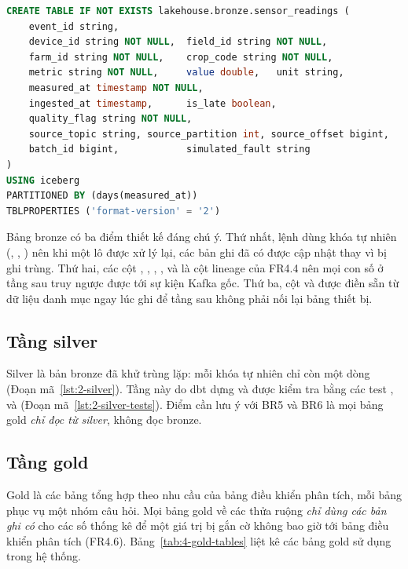 \begin{lstlisting}[language=SQL, caption={Bảng bronze}, label={lst:4-bronze-ddl}]
CREATE TABLE IF NOT EXISTS lakehouse.bronze.sensor_readings (
    event_id string,
    device_id string NOT NULL,  field_id string NOT NULL,
    farm_id string NOT NULL,    crop_code string NOT NULL,
    metric string NOT NULL,     value double,   unit string,
    measured_at timestamp NOT NULL,
    ingested_at timestamp,      is_late boolean,
    quality_flag string NOT NULL,
    source_topic string, source_partition int, source_offset bigint,
    batch_id bigint,            simulated_fault string
)
USING iceberg
PARTITIONED BY (days(measured_at))
TBLPROPERTIES ('format-version' = '2')
\end{lstlisting}

Bảng bronze có ba điểm thiết kế đáng chú ý. Thứ nhất, lệnh  dùng khóa tự nhiên (, , ) nên khi một lô được xử lý lại, các bản ghi đã có được cập nhật thay vì bị ghi trùng. Thứ hai, các cột , , , ,  và  là cột lineage của FR4.4 nên mọi con số ở tầng sau truy ngược được tới sự kiện Kafka gốc. Thứ ba, cột  và  được điền sẵn từ dữ liệu danh mục ngay lúc ghi để tầng sau không phải nối lại bảng thiết bị.

\subsection{Tầng silver}
\label{sec:4-silver}

Silver là bản bronze đã khử trùng lặp: mỗi khóa tự nhiên chỉ còn một dòng (Đoạn mã~\ref{lst:2-silver}). Tầng này do dbt dựng và được kiểm tra bằng các test ,  và  (Đoạn mã~\ref{lst:2-silver-tests}). Điểm cần lưu ý với BR5 và BR6 là mọi bảng gold \emph{chỉ đọc từ silver}, không đọc bronze.

\subsection{Tầng gold}
\label{sec:4-gold}

Gold là các bảng tổng hợp theo nhu cầu của bảng điều khiển phân tích, mỗi bảng phục vụ một nhóm câu hỏi. Mọi bảng gold về các thửa ruộng \emph{chỉ dùng các bản ghi có } cho các số thống kê để một giá trị bị gắn cờ không bao giờ tới bảng điều khiển phân tích (FR4.6). Bảng~\ref{tab:4-gold-tables} liệt kê các bảng gold sử dụng trong hệ thống.

